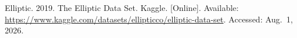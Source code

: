 \documentclass[12pt,a4paper]{report}
\begin{document}
{\begin{enumerate}[label={[\arabic*]}]




\item Elliptic. 2019. The Elliptic Data Set. Kaggle. [Online]. Available: \url{https://www.kaggle.com/datasets/ellipticco/elliptic-data-set}. Accessed: Aug.~1, 2026.




\end{enumerate}}
\end{document}
